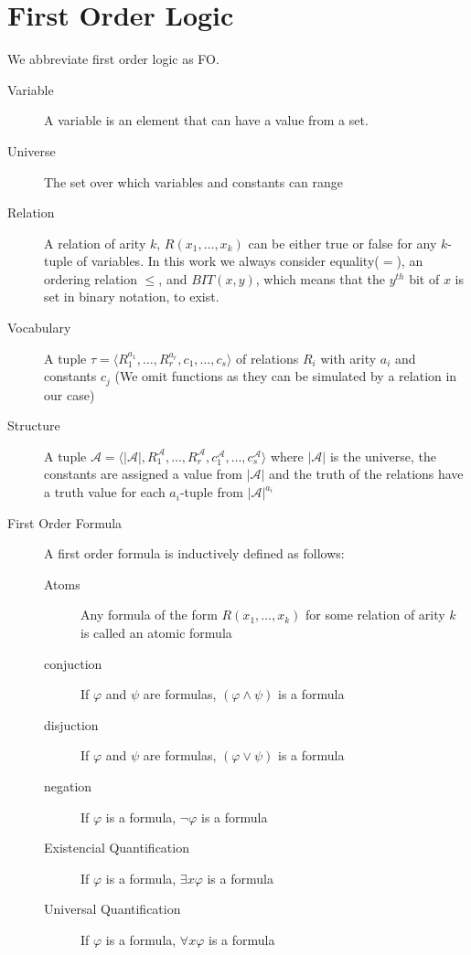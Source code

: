 \section{First Order Logic}\label{sec:first-order-logic}
We abbreviate first order logic as FO.
\begin{description}
    \item[Variable] A variable is an element that can have a value from a set.
    \item[Universe] The set over which variables and constants can range
    \item[Relation] A relation of arity $k$, $R(x_1, \dots, x_k)$ can be either true or false for any $k$-tuple of variables. In this work we always consider equality($=$), an ordering relation $\leq$, and $BIT(x, y)$, which means that the $y^{th}$ bit of $x$ is set in binary notation, to exist.
    \item[Vocabulary] A tuple $\tau = \langle R_1^{a_1}, \dots, R_r^{a_r}, c_1, \dots, c_s \rangle$ of relations $R_i$ with arity $a_i$ and constants $c_j$ (We omit functions as they can be simulated by a relation in our case)
    \item[Structure] A tuple $\mathcal{A} = \langle |\mathcal{A}|, R_1^{\mathcal{A}}, \dots, R_r^{\mathcal{A}}, c_1^{\mathcal{A}}, \dots, c_s^{\mathcal{A}} \rangle$ where $|\mathcal{A}|$ is the universe, the constants are assigned a value from $|\mathcal{A}|$ and the truth of the relations have a truth value for each $a_i$-tuple from $|\mathcal{A}|^{a_i}$
    \item[First Order Formula] A first order formula is inductively defined as follows:
    \begin{description}
        \item[Atoms] Any formula of the form $R(x_1, \dots, x_k)$ for some relation of arity $k$ is called an atomic formula
        \item[conjuction] If $\varphi$ and $\psi$ are formulas, $(\varphi \land \psi)$ is a formula
        \item[disjuction] If $\varphi$ and $\psi$ are formulas, $(\varphi \lor \psi)$ is a formula
        \item[negation] If $\varphi$ is a formula, $\lnot \varphi$ is a formula
        \item[Existencial Quantification] If $\varphi$ is a formula, $\exists x \varphi$ is a formula
        \item[Universal Quantification] If $\varphi$ is a formula, $\forall x \varphi$ is a formula
    \end{description}

\end{description}
